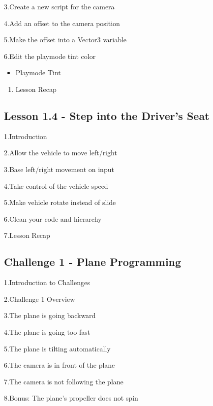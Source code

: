 \documentclass[
]{book}
\providecommand{\tightlist}{%
  \setlength{\itemsep}{0pt}\setlength{\parskip}{0pt}}
\begin{document}
3.Create a new script for the camera

4.Add an offset to the camera position

5.Make the offset into a Vector3 variable

6.Edit the playmode tint color

\begin{itemize}
\tightlist
\item
  Playmode Tint
\end{itemize}

\begin{enumerate}
\def\labelenumi{\arabic{enumi}.}
\setcounter{enumi}{6}
\tightlist
\item
  Lesson Recap
\end{enumerate}

\hypertarget{lesson-1.4---step-into-the-drivers-seat}{%
\subsection{Lesson 1.4 - Step into the Driver's Seat}\label{lesson-1.4---step-into-the-drivers-seat}}

1.Introduction

2.Allow the vehicle to move left/right

3.Base left/right movement on input

4.Take control of the vehicle speed

5.Make vehicle rotate instead of slide

6.Clean your code and hierarchy

7.Lesson Recap

\hypertarget{challenge-1---plane-programming}{%
\subsection{Challenge 1 - Plane Programming}\label{challenge-1---plane-programming}}

1.Introduction to Challenges

2.Challenge 1 Overview

3.The plane is going backward

4.The plane is going too fast

5.The plane is tilting automatically

6.The camera is in front of the plane

7.The camera is not following the plane

8.Bonus: The plane's propeller does not spin
\end{document}

